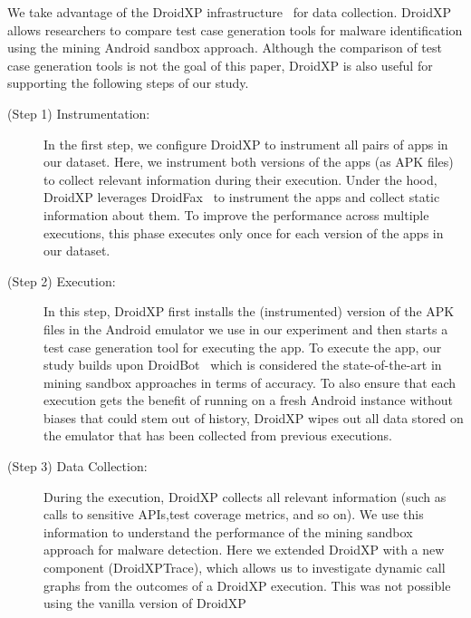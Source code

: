 We take advantage of the DroidXP infrastructure~\cite{DBLP:conf/scam/CostaMCMVBC20}
for data collection. DroidXP allows researchers to compare 
test case generation tools for malware identification using the
mining Android sandbox approach. Although the comparison of test
case generation tools is not the goal of this paper, DroidXP
is also useful for supporting the following steps of our study.

\begin{description}
 \item[(Step 1) Instrumentation:] In the first step,
we configure DroidXP to instrument all pairs of apps in our dataset.
Here, we instrument both versions of the apps (as APK files) to collect relevant information during their execution. Under the hood, DroidXP leverages
DroidFax~\cite{DBLP:conf/icsm/CaiR17a} to instrument the apps and collect static
information about them. To improve the performance across multiple executions,
this phase executes only once for each version of the apps in our dataset.

\item[(Step 2) Execution:] In this step, DroidXP first installs the (instrumented) version of the APK files in the
  Android emulator we use in our experiment and then starts a test case generation tool for executing the app. To execute the app, our study builds upon DroidBot~\cite{DBLP:conf/icse/LiYGC17} which is considered the state-of-the-art in mining sandbox approaches in terms of accuracy. To also ensure
  that each execution gets the benefit of running on a fresh Android instance without biases that could stem out of history,
  DroidXP wipes out all data stored on the emulator that has been collected from previous executions.

\item[(Step 3) Data Collection:] During the execution, DroidXP collects all relevant information (such as calls to sensitive APIs,test coverage metrics, and so on). We use this information to understand the performance of the mining sandbox approach for malware detection. Here we extended DroidXP with a new component (DroidXPTrace), which allows us to investigate dynamic call graphs from the outcomes of a DroidXP execution. This was not possible using the vanilla version of DroidXP %
\end{description}


